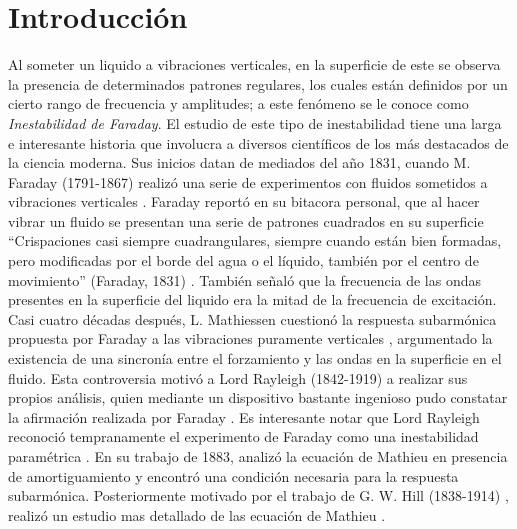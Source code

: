 \chapter*{Introducción}

Al someter un liquido a vibraciones verticales, en la superficie de este se observa la presencia de determinados patrones regulares, los cuales están definidos por un cierto rango de frecuencia y amplitudes; a este fenómeno se le conoce como \textit{Inestabilidad de Faraday}. El estudio de este tipo de inestabilidad tiene una larga e interesante historia que involucra a diversos científicos de los más destacados de la ciencia moderna. Sus inicios datan de mediados del año 1831, cuando M. Faraday (1791-1867) realizó una serie de experimentos con fluidos sometidos a vibraciones verticales \cite{Faraday1831}. Faraday reportó en su bitacora personal, que al hacer vibrar un fluido se presentan una serie de patrones cuadrados en su superficie ``Crispaciones casi siempre cuadrangulares, siempre cuando están bien formadas, pero modificadas por el borde del agua o el líquido, también por el centro de movimiento'' (Faraday, 1831) \cite{Martin1832} . También señaló que la frecuencia de las ondas presentes en la superficie del liquido era la mitad de la frecuencia de excitación. Casi cuatro décadas después, L. Mathiessen cuestionó la respuesta subarmónica propuesta por Faraday a las vibraciones puramente verticales \cite{Matthiessen1868}, argumentado la existencia de una sincronía entre el forzamiento y las ondas en la superficie en el fluido. Esta controversia motivó a Lord Rayleigh (1842-1919) a realizar sus propios análisis, quien mediante un dispositivo bastante ingenioso pudo constatar la afirmación realizada por Faraday \cite{Rayleigh1883b}. Es interesante notar que Lord Rayleigh reconoció tempranamente el experimento de Faraday como una inestabilidad paramétrica \cite{Rayleigh1883a}. En su trabajo de 1883, analizó la ecuación de Mathieu en presencia de amortiguamiento y encontró una condición necesaria para la respuesta subarmónica. Posteriormente motivado por el trabajo de G. W. Hill (1838-1914) \cite{Hill1886}, realizó un estudio mas detallado de las ecuación de Mathieu \cite{Rayleigh1887}.\medskip



